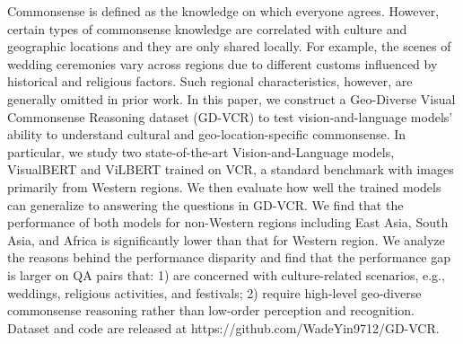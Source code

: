 Commonsense is defined as the knowledge on which everyone agrees. However, certain types of commonsense knowledge are correlated with culture and geographic locations and they are only shared locally. For example, the scenes of wedding ceremonies vary across regions due to different customs influenced by historical and religious factors. Such regional characteristics, however, are generally omitted in prior work. In this paper, we construct a Geo-Diverse Visual Commonsense Reasoning dataset (GD-VCR) to test vision-and-language models' ability to understand cultural and geo-location-specific commonsense. In particular, we study two state-of-the-art Vision-and-Language models, VisualBERT and ViLBERT trained on VCR, a standard benchmark with images primarily from Western regions. We then evaluate how well the trained models can generalize to answering the questions in GD-VCR. We find that the performance of both models for non-Western regions including East Asia, South Asia, and Africa is significantly lower than that for Western region. We analyze the reasons behind the performance disparity and find that the performance gap is larger on QA pairs that: 1) are concerned with culture-related scenarios, e.g., weddings, religious activities, and festivals; 2) require high-level geo-diverse commonsense reasoning rather than low-order perception and recognition. Dataset and code are released at https://github.com/WadeYin9712/GD-VCR.

